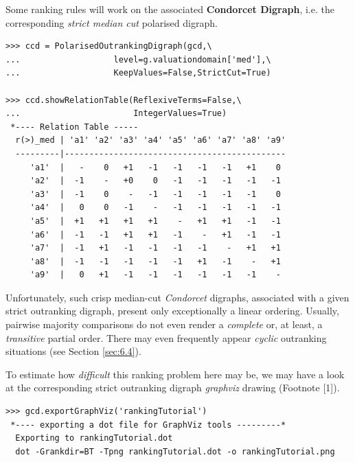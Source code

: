 Some ranking rules will work on the associated \textbf{Condorcet Digraph}, i.e. the corresponding \emph{strict median cut} polarised digraph.
 
\begin{lstlisting}[caption={Median cut polarised strict outranking relation characteristics},label=list:8.2]
>>> ccd = PolarisedOutrankingDigraph(gcd,\
...                   level=g.valuationdomain['med'],\
...                   KeepValues=False,StrictCut=True)

>>> ccd.showRelationTable(ReflexiveTerms=False,\
...                       IntegerValues=True)
 *---- Relation Table -----
  r(>)_med | 'a1' 'a2' 'a3' 'a4' 'a5' 'a6' 'a7' 'a8' 'a9'   
  ---------|---------------------------------------------
     'a1'  |   -    0   +1   -1   -1   -1   -1   +1    0  
     'a2'  |  -1    -   +0    0   -1   -1   -1   -1   -1  
     'a3'  |  -1    0    -   -1   -1   -1   -1   -1    0  
     'a4'  |   0    0   -1    -   -1   -1   -1   -1   -1  
     'a5'  |  +1   +1   +1   +1    -   +1   +1   -1   -1  
     'a6'  |  -1   -1   +1   +1   -1    -   +1   -1   -1  
     'a7'  |  -1   +1   -1   -1   -1   -1    -   +1   +1  
     'a8'  |  -1   -1   -1   -1   -1   +1   -1    -   +1  
     'a9'  |   0   +1   -1   -1   -1   -1   -1   -1    -   
\end{lstlisting}

Unfortunately, such crisp median-cut \emph{Condorcet} digraphs, associated with a given strict outranking digraph, present only exceptionally a linear ordering. Usually, pairwise majority comparisons do not even render a \emph{complete} or, at least, a \emph{transitive} partial order. There may even frequently appear \emph{cyclic} outranking situations (see Section \ref{sec:6.4}).

To estimate how \emph{difficult} this ranking problem here may be, we may have a look at the corresponding strict outranking digraph \emph{graphviz} drawing (Footnote [1]).

\begin{lstlisting}
>>> gcd.exportGraphViz('rankingTutorial')
 *---- exporting a dot file for GraphViz tools ---------*
  Exporting to rankingTutorial.dot
  dot -Grankdir=BT -Tpng rankingTutorial.dot -o rankingTutorial.png
\end{lstlisting}


